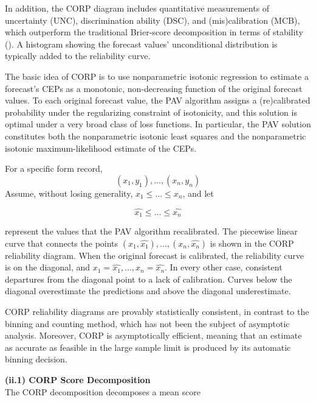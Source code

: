 \documentclass[a4paper,12pt]{article}
\numberwithin{equation}{section}
\begin{document}
      In addition, the CORP diagram includes quantitative measurements of uncertainty (UNC), discrimination ability (DSC), and (mis)calibration (MCB), which outperform the traditional Brier-score decomposition in terms of stability (\cite{roc1}). A histogram showing the forecast values' unconditional distribution is typically added to the reliability curve.\bigskip

      The basic idea of CORP is to use nonparametric isotonic regression to estimate a forecast's CEPs as a monotonic, non-decreasing function of the original forecast values. To each original forecast value, the PAV algorithm assigns a (re)calibrated probability under the regularizing constraint of isotonicity, and this solution is optimal under a very broad class of loss functions. In particular, the PAV solution constitutes both the nonparametric isotonic least squares and the nonparametric isotonic maximum-likelihood estimate of the CEPs.\bigskip

      For a specific form record, \begin{equation} \label{e:record} \left( x_{1},y_{1}\right),...,\left(x_{n},y_{n} \right)\end{equation} Assume, without losing generality, $x_{1} \leq ... \leq x_{n}$, and let 
      
      \begin{equation} \label{e:recalibrated} 
      \hat{x_{1}} \leq ... \leq \hat{x_{n}}
      \end{equation}

      represent the values that the PAV algorithm recalibrated. The piecewise linear curve that connects the points $(x_{1},\hat{x_{1}}),...,(x_{n},\hat{x_{n}})$ is shown in the CORP reliability diagram. When the original forecast is calibrated, the reliability curve is on the diagonal, and  $x_{1} = \hat{x_{1}},...,x_{n} = \hat{x_{n}}$. In every other case, consistent departures from the diagonal point to a lack of calibration. Curves below the diagonal overestimate the predictions and above the diagonal  underestimate.\bigskip

      CORP reliability diagrams are provably statistically consistent, in contrast to the binning and counting method, which has not been the subject of asymptotic analysis. Moreover, CORP is asymptotically efficient, meaning that an estimate as accurate as feasible in the large sample limit is produced by its automatic binning decision.\bigskip

      {\bf (ii.1) CORP Score Decomposition\\}
      The CORP decomposition decomposes a mean score 
      
\end{document}
